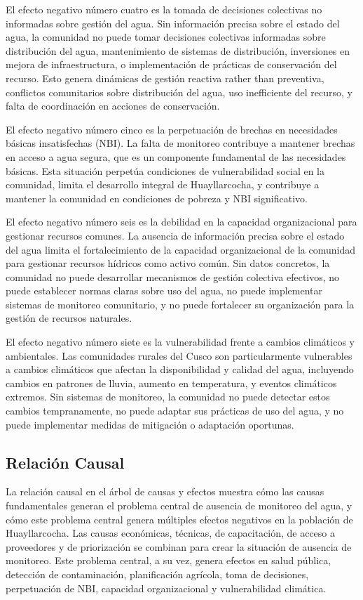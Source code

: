 El efecto negativo número cuatro es la tomada de decisiones colectivas no informadas sobre gestión del agua. Sin información precisa sobre el estado del agua, la comunidad no puede tomar decisiones colectivas informadas sobre distribución del agua, mantenimiento de sistemas de distribución, inversiones en mejora de infraestructura, o implementación de prácticas de conservación del recurso. Esto genera dinámicas de gestión reactiva rather than preventiva, conflictos comunitarios sobre distribución del agua, uso inefficiente del recurso, y falta de coordinación en acciones de conservación.

El efecto negativo número cinco es la perpetuación de brechas en necesidades básicas insatisfechas (NBI). La falta de monitoreo contribuye a mantener brechas en acceso a agua segura, que es un componente fundamental de las necesidades básicas. Esta situación perpetúa condiciones de vulnerabilidad social en la comunidad, limita el desarrollo integral de Huayllarcocha, y contribuye a mantener la comunidad en condiciones de pobreza y NBI significativo.

El efecto negativo número seis es la debilidad en la capacidad organizacional para gestionar recursos comunes. La ausencia de información precisa sobre el estado del agua limita el fortalecimiento de la capacidad organizacional de la comunidad para gestionar recursos hídricos como activo común. Sin datos concretos, la comunidad no puede desarrollar mecanismos de gestión colectiva efectivos, no puede establecer normas claras sobre uso del agua, no puede implementar sistemas de monitoreo comunitario, y no puede fortalecer su organización para la gestión de recursos naturales.

El efecto negativo número siete es la vulnerabilidad frente a cambios climáticos y ambientales. Las comunidades rurales del Cusco son particularmente vulnerables a cambios climáticos que afectan la disponibilidad y calidad del agua, incluyendo cambios en patrones de lluvia, aumento en temperatura, y eventos climáticos extremos. Sin sistemas de monitoreo, la comunidad no puede detectar estos cambios tempranamente, no puede adaptar sus prácticas de uso del agua, y no puede implementar medidas de mitigación o adaptación oportunas.

\subsection{Relación Causal}

La relación causal en el árbol de causas y efectos muestra cómo las causas fundamentales generan el problema central de ausencia de monitoreo del agua, y cómo este problema central genera múltiples efectos negativos en la población de Huayllarcocha. Las causas económicas, técnicas, de capacitación, de acceso a proveedores y de priorización se combinan para crear la situación de ausencia de monitoreo. Este problema central, a su vez, genera efectos en salud pública, detección de contaminación, planificación agrícola, toma de decisiones, perpetuación de NBI, capacidad organizacional y vulnerabilidad climática.

